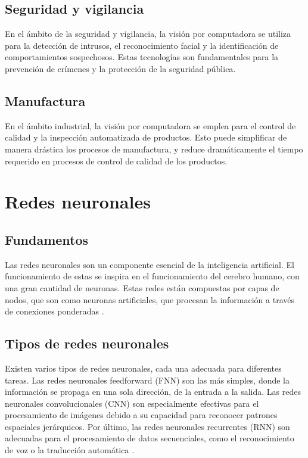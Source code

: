 \subsection{Seguridad y vigilancia}
En el ámbito de la seguridad y vigilancia, la visión por computadora se utiliza para la detección de intrusos, el reconocimiento facial y la identificación de comportamientos sospechosos.
Estas tecnologías son fundamentales para la prevención de crímenes y la protección de la seguridad pública.

\subsection{Manufactura}
En el ámbito industrial, la visión por computadora se emplea para el control de calidad y la inspección automatizada de productos. 
Esto puede simplificar de manera drástica los procesos de manufactura, y reduce dramáticamente el tiempo requerido en procesos de control de calidad de los productos. 

\section{Redes neuronales}

\subsection{Fundamentos}
Las redes neuronales son un componente esencial de la inteligencia artificial.
El funcionamiento de estas se inspira en el funcionamiento del cerebro humano, con una gran cantidad de neuronas.
Estas redes están compuestas por capas de nodos, que son como neuronas artificiales, que procesan la información a través de conexiones ponderadas \cite{goodfellow2016}.

\subsection{Tipos de redes neuronales}
Existen varios tipos de redes neuronales, cada una adecuada para diferentes tareas.
Las redes neuronales feedforward (FNN) son las más simples, donde la información se propaga en una sola dirección, de la entrada a la salida.
Las redes neuronales convolucionales (CNN) son especialmente efectivas para el procesamiento de imágenes debido a su capacidad para reconocer patrones espaciales jerárquicos.
Por último, las redes neuronales recurrentes (RNN) son adecuadas para el procesamiento de datos secuenciales, como el reconocimiento de voz o la traducción automática \cite{ibm2024}.

